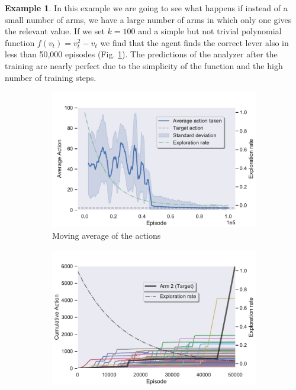 \documentclass[11pt,a4paper,twoside]{report}
\newcommand{\+}{\textnormal{+} }
\theoremstyle{definition}
\newtheorem{myex}[mythm]{Example}
\numberwithin{equation}{chapter}
\begin{document}
  \begin{myex} \label{MAB3ex}
    In this example we are going to see what happens if instead of a small
    number of arms, we have a large number of arms in which only one gives the
    relevant value. If we set $k=100$ and a simple but not trivial polynomial
    function $f(v_t)=v_t^2-v_t$ we find that the agent finds the correct lever
    also in less than 50,000 episodes (Fig. \ref{fig:ActionAverageMAB3}). The
    predictions of the analyzer after the training are nearly perfect due to
    the simplicity of the function and the high number of training steps.

    \begin{figure}[]
      \centering
      \begin{subfigure}{.5\textwidth}
        \centering
        \includegraphics[width=1\linewidth]{figures/Actions-MAB3.pdf}
        \caption{Moving average of the actions}
        \label{fig:ActionAverageMAB3}
      \end{subfigure}%
      \begin{subfigure}{.5\textwidth}
        \centering
        \includegraphics[width=1\linewidth]{figures/Cum-action-MAB3.pdf}

\end{subfigure}
\end{figure}
\end{myex}
\end{document}
